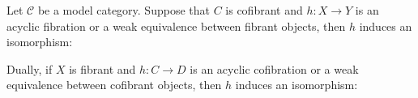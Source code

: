 \documentclass[../thesis.tex]{subfiles}
\begin{document}
            \begin{lemma}\label{lem: Weird-Whitehead}
                Let $\mathcal{C}$ be a model category. Suppose that $C$ is cofibrant and $h: X \rightarrow Y$ is an acyclic fibration or a weak equivalence between fibrant objects, then $h$ induces an isomorphism:
                \begin{center}
                \end{center}

                Dually, if $X$ is fibrant and $h : C \rightarrow D$ is an acyclic cofibration or a weak equivalence between cofibrant objects, then $h$ induces an isomorphism:
                \begin{center}
                \end{center}
            \end{lemma}
\end{document}

